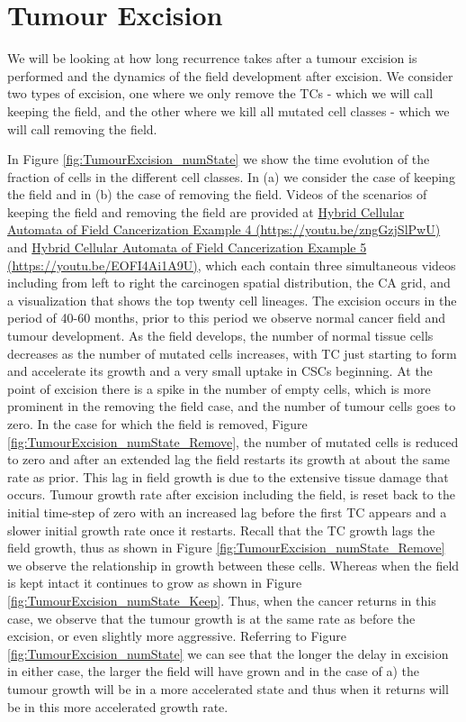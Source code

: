 \documentclass[\main/thesis.tex]{subfiles}
\begin{document}
\section{Tumour Excision}
We will be looking at how long recurrence takes after a tumour excision is performed and the dynamics of the field development after excision. We consider two types of excision, one where we only remove the TCs - which we will call keeping the field, and the other where we kill all mutated cell classes - which we will call removing the field. 

In Figure \ref{fig:TumourExcision_numState} we show the time evolution of the fraction of cells in the different cell classes. In (a) we consider the case of keeping the field and in (b) the case of removing the field. Videos of the scenarios of keeping the field and removing the field are provided at \href{https://youtu.be/zngGzjSlPwU}{Hybrid Cellular Automata of Field Cancerization Example 4 (https://youtu.be/zngGzjSlPwU)} and \href{https://youtu.be/EOFI4Ai1A9U}{Hybrid Cellular Automata of Field Cancerization Example 5 (https://youtu.be/EOFI4Ai1A9U)}, which each contain three simultaneous videos including from left to right the carcinogen spatial distribution, the CA grid, and a visualization that shows the top twenty cell lineages. The excision occurs in the period of 40-60 months, prior to this period we observe normal cancer field and tumour development. As the field develops, the number of normal tissue cells decreases as the number of mutated cells increases, with TC just starting to form and accelerate its growth and a very small uptake in CSCs beginning. At the point of excision there is a spike in the number of empty cells, which is more prominent in the removing the field case, and the number of tumour cells goes to zero. In the case for which the field is removed, Figure \ref{fig:TumourExcision_numState_Remove}, the number of mutated cells is reduced to zero and after an extended lag the field restarts its growth at about the same rate as prior. This lag in field growth is due to the extensive tissue damage that occurs. Tumour growth rate after excision including the field, is reset back to the initial time-step of zero with an increased lag before the first TC appears and a slower initial growth rate once it restarts. Recall that the TC growth lags the field growth, thus as shown in Figure \ref{fig:TumourExcision_numState_Remove} we observe the relationship in growth between these cells. Whereas when the field is kept intact it continues to grow as shown in Figure \ref{fig:TumourExcision_numState_Keep}. Thus, when the cancer returns in this case, we observe that the tumour growth is at the same rate as before the excision, or even slightly more aggressive. Referring to Figure \ref{fig:TumourExcision_numState} we can see that the longer the delay in excision in either case, the larger the field will have grown and in the case of a) the tumour growth will be in a more accelerated state and thus when it returns will be in this more accelerated growth rate.
\end{document}
